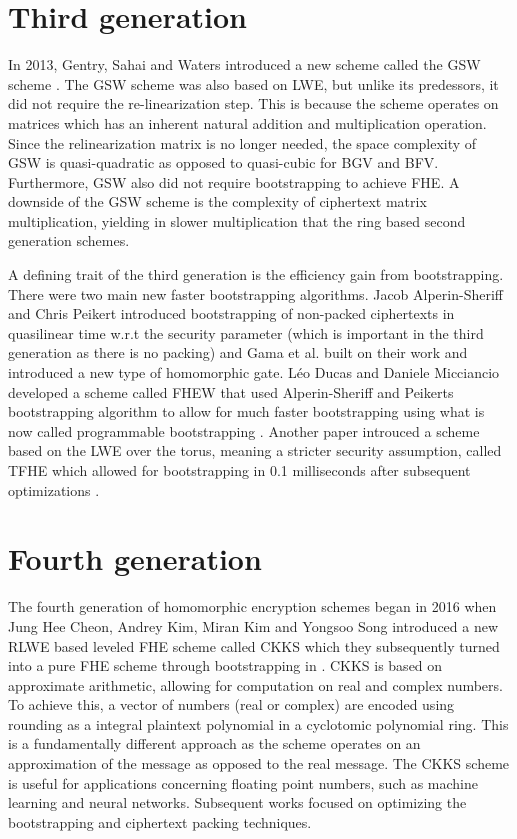 \section{Third generation}
In 2013, Gentry, Sahai and Waters introduced a new scheme called the GSW scheme \cite{GSW13}. The GSW scheme was also based on LWE, but unlike its predessors, it did not require the re-linearization step. This is because the scheme operates on matrices which has an inherent natural addition and multiplication operation. Since the relinearization matrix is no longer needed, the space complexity of GSW is quasi-quadratic as opposed to quasi-cubic for BGV and BFV. Furthermore, GSW also did not require bootstrapping to achieve FHE. A downside of the GSW scheme is the complexity of ciphertext matrix multiplication, yielding in slower multiplication that the ring based second generation schemes.

A defining trait of the third generation is the efficiency gain from bootstrapping. There were two main new faster bootstrapping algorithms. Jacob Alperin-Sheriff and Chris Peikert \cite{A-S-P-boot} introduced bootstrapping of non-packed ciphertexts in quasilinear time w.r.t the security parameter (which is important in the third generation as there is no packing) and Gama et al. \cite{Gama-boot} built on their work and introduced a new type of homomorphic gate. Léo Ducas and Daniele Micciancio developed a scheme called FHEW that used Alperin-Sheriff and Peikerts bootstrapping algorithm to allow for much faster bootstrapping using what is now called programmable bootstrapping \cite{FHEW}. Another paper introuced a scheme based on the LWE over the torus, meaning a stricter security assumption, called TFHE \cite{TFHE} which allowed for bootstrapping in 0.1 milliseconds after subsequent optimizations \cite{MP-fhew-tfhe}.

\section{Fourth generation}
The fourth generation of homomorphic encryption schemes began in 2016 when Jung Hee Cheon, Andrey Kim, Miran Kim and Yongsoo Song introduced a new RLWE based leveled FHE scheme called CKKS \cite{CKKS16} which they subsequently turned into a pure FHE scheme through bootstrapping in \cite{CKKS-boot}. CKKS is based on approximate arithmetic, allowing for computation on real and complex numbers. To achieve this, a vector of numbers (real or complex) are encoded using rounding as a integral plaintext polynomial in a cyclotomic polynomial ring. This is a fundamentally different approach as the scheme operates on an approximation of the message as opposed to the real message. The CKKS scheme is useful for applications concerning floating point numbers, such as machine learning and neural networks. Subsequent works focused on optimizing the bootstrapping and ciphertext packing techniques.

